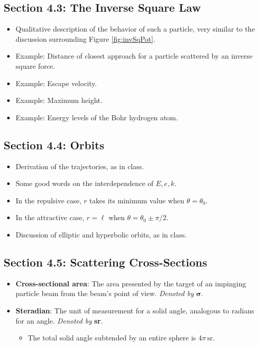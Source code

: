 \documentclass[../notes.tex]{subfiles}
\begin{document}
\subsection*{Section 4.3: The Inverse Square Law}
\begin{itemize}
    \item Qualitative description of the behavior of such a particle, very similar to the discussion surrounding Figure \ref{fig:invSqPot}.
    \item Example: Distance of closest approach for a particle scattered by an inverse square force.
    \item Example: Escape velocity.
    \item Example: Maximum height.
    \item Example: Energy levels of the Bohr hydrogen atom.
\end{itemize}


\subsection*{Section 4.4: Orbits}
\begin{itemize}
    \item Derivation of the trajectories, as in class.
    \item Some good words on the interdependence of $E,e,k$.
    \item In the repulsive case, $r$ takes its minimum value when $\theta=\theta_0$.
    \item In the attractive case, $r=\ell$ when $\theta=\theta_0\pm\pi/2$.
    \item Discussion of elliptic and hyperbolic orbits, as in class.
\end{itemize}


\subsection*{Section 4.5: Scattering Cross-Sections}
\begin{itemize}
    \item \textbf{Cross-sectional area}: The area presented by the target of an impinging particle beam from the beam's point of view. \emph{Denoted by} $\bm{\sigma}$.
    \item \textbf{Steradian}: The unit of measurement for a solid angle, analogous to radians for an angle. \emph{Denoted by} \textbf{sr}.
    \begin{itemize}
        \item The total solid angle subtended by an entire sphere is $4\pi\,\si{\steradian}$.
    \end{itemize}
\end{itemize}
\end{document}

